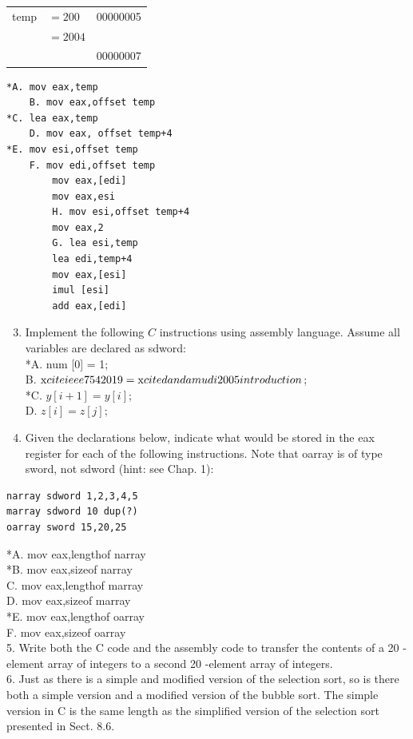 \documentclass[10pt]{book}
\begin{document}
\begin{center}
\begin{tabular}{rl|l|}
temp & $=200$ & 00000005 \\
 & $=2004$ &  \\
 &  & 00000007 \\
\hline
\end{tabular}
\end{center}

\begin{verbatim}
*A. mov eax,temp
    B. mov eax,offset temp
*C. lea eax,temp
    D. mov eax, offset temp+4
*E. mov esi,offset temp
    F. mov edi,offset temp
        mov eax,[edi]
        mov eax,esi
        H. mov esi,offset temp+4
        mov eax,2
        G. lea esi,temp
        lea edi,temp+4
        mov eax,[esi]
        imul [esi]
        add eax,[edi]
\end{verbatim}

\begin{enumerate}
  \setcounter{enumi}{2}
  \item Implement the following $C$ instructions using assembly language. Assume all variables are declared as sdword:\\[0pt]
*A. num [0] = 1;\\
B. $\mathrm{x}\\cite{ieee7542019}=\mathrm{x}\\cite{dandamudi2005introduction}$;\\
*C. $y[i+1]=y[i]$;\\
D. $z[i]=z[j] ;$
  \item Given the declarations below, indicate what would be stored in the eax register for each of the following instructions. Note that oarray is of type sword, not sdword (hint: see Chap. 1):
\end{enumerate}

\begin{verbatim}
narray sdword 1,2,3,4,5
marray sdword 10 dup(?)
oarray sword 15,20,25
\end{verbatim}

*A. mov eax,lengthof narray\\
*B. mov eax,sizeof narray\\
C. mov eax,lengthof marray\\
D. mov eax,sizeof marray\\
*E. mov eax,lengthof oarray\\
F. mov eax,sizeof oarray\\
5. Write both the C code and the assembly code to transfer the contents of a 20 -element array of integers to a second 20 -element array of integers.\\
6. Just as there is a simple and modified version of the selection sort, so is there both a simple version and a modified version of the bubble sort. The simple version in C is the same length as the simplified version of the selection sort presented in Sect. 8.6.\\
\end{document}
